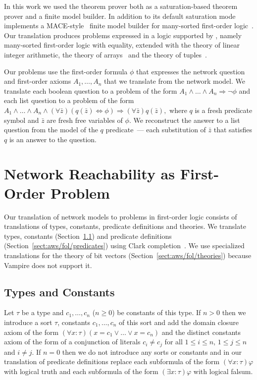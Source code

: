 In this work we used the \vampire theorem prover both as a saturation-based theorem prover and a finite model builder. In addition to its default saturation mode \vampire implements a MACE-style~\cite{mccune1994davis} finite model builder for many-sorted first-order logic~\cite{VampireFMB}. Our translation produces problems expressed in a logic supported by \vampire, namely many-sorted first-order logic with equality, extended with the theory of linear integer arithmetic, the theory of arrays~\cite{VampireAndFOOL} and the theory of tuples~\cite{KKV18}. %

Our problems use the first-order formula $\phi$ that expresses the network question and first-order axioms $A_1,\ldots,A_n$ that we translate from the network model. We translate each boolean question to a problem of the form $A_1\wedge\ldots\wedge A_n \Rightarrow \neg\phi$ and each list question to a problem of the form $A_1\wedge\ldots\wedge A_n \wedge (\forall \bar{z})(q(\bar{z})\Leftrightarrow \phi) \Rightarrow (\forall \bar{z})q(\bar{z}),$ where $q$ is a fresh predicate symbol and $\bar{z}$ are fresh free variables of $\phi$. We reconstruct the answer to a list question from the model of the $q$ predicate~--- each substitution of $\bar{z}$ that satisfies $q$ is an answer to the question.

\section{Network Reachability as First-Order Problem}\label{sect:aws/fol}
Our translation of network models to problems in first-order logic consists of translations of types, constants, predicate definitions and theories. We translate types, constants (Section~\ref{sect:aws/fol/types}) and predicate definitions (Section~\ref{sect:aws/fol/predicates}) using Clark completion~\cite{DBLP:conf/adbt/Clark77}. We use specialized translations for the theory of bit vectors (Section~\ref{sect:aws/fol/theories}) because Vampire does not support it.

\subsection{Types and Constants}\label{sect:aws/fol/types}
Let $\tau$ be a type and $c_1,\ldots,c_n$ ($n\ge0$) be constants of this type. If $n>0$ then we introduce a sort $\tau$, constants $c_1,\ldots,c_n$ of this sort and add the domain closure axiom of the form $(\forall x:\tau)(x=c_1 \vee\ldots\vee x=c_n)$ and the distinct constants axiom of the form of a conjunction of literals $c_i\not=c_j$ for all $1\le i\le n$, $1\le j\le n$ and $i\not=j$. If $n=0$ then we do not introduce any sorts or constants and in our translation of predicate definitions replace each subformula of the form $(\forall x:\tau)\varphi$ with logical truth and each subformula of the form $(\exists x:\tau)\varphi$ with logical falsum.

